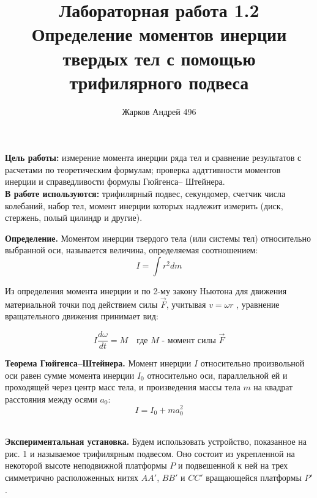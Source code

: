 \documentclass[12pt]{article}
\begin{document}
    \author {Жарков Андрей 496}
    \title {Лабораторная работа 1.2 \\ Определение моментов инерции твердых тел с помощью трифилярного подвеса}
    \maketitle{}   
    
    \indent
    \textbf{Цель работы:} измерение момента инерции ряда тел и сравнение результатов с расчетами по теоретическим формулам; проверка аддттивности моментов инерции и справедливости формулы Гюйгенса– Штейнера.
    \\\newline
    \indent
    \textbf{В работе используются:} трифилярный подвес, секундомер, счетчик числа колебаний, набор тел, момент инерции которых надлежит измерить (диск, стержень, полый цилиндр и другие).
    \\\newline
    
    \textbf{Определение.} Моментом инерции твердого тела (или системы тел) относительно выбранной оси, называется величина, определяемая соотношением: 
    \begin{equation}
              I = \int r^2dm
    \end{equation} 
    
    Из определения момента инерции и по 2-му закону Ньютона для движения материальной точки под действием силы $\vec{F}$, учитывая $v = \omega r$ , уравнение вращательного движения принимает вид:

    \begin{equation}
              I \frac{d\omega}{dt} = M \quad \text{где $M$ - момент силы $\vec{F}$}
    \end{equation} 

    \textbf{Теорема Гюйгенса–Штейнера.} Момент инерции $I$ относительно произвольной оси равен сумме момента инерции $I_0$ относительно оси, параллельной ей и проходящей через центр масс тела, и произведения массы тела $m$ на квадрат расстояния между осями $a_0$:
    \begin{equation}
        I = I_0 + ma^2_0
    \end{equation} \\\newline

    \textbf{Экспериментальная установка.} Будем использовать устройство, показанное на рис. 1 и называемое трифилярным подвесом. Оно состоит из укрепленной на некоторой высоте неподвижной платформы $P$ и подвешенной к ней на трех симметрично расположенных нитях $AA'$, $BB'$ и $CC'$ вращающейся платформы $P'$.
\end{document}
